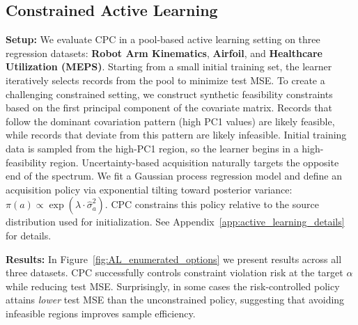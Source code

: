 \subsection{Constrained Active Learning}
\label{subsec:active_learning_experiments}

\textbf{Setup:}
We evaluate CPC in a pool-based active learning setting on three regression datasets: \textbf{Robot Arm Kinematics}, \textbf{Airfoil}, and \textbf{Healthcare Utilization (MEPS)}. Starting from a small initial training set, the learner iteratively selects records from the pool to minimize test MSE.
To create a challenging constrained setting, we construct synthetic feasibility constraints based on the first principal component of the covariate matrix. Records that follow the dominant covariation pattern (high PC1 values) are likely feasible, while records that deviate from this pattern are likely infeasible. Initial training data is sampled from the high-PC1 region, so the learner begins in a high-feasibility region. Uncertainty-based acquisition naturally targets the opposite end of the spectrum.
We fit a Gaussian process regression model and define an acquisition policy via exponential tilting toward posterior variance: $\pi(a) \propto \exp(\lambda \cdot \hat{\sigma}^2_a)$. CPC constrains this policy relative to the source distribution used for initialization. See Appendix~\ref{app:active_learning_details} for details.



\textbf{Results:}
In Figure~\ref{fig:AL_enumerated_options} we present results across all three datasets. CPC successfully controls constraint violation risk at the target $\alpha$ while reducing test MSE. Surprisingly, in some cases the risk-controlled policy attains \textit{lower} test MSE than the unconstrained policy, suggesting that avoiding infeasible regions improves sample efficiency.

